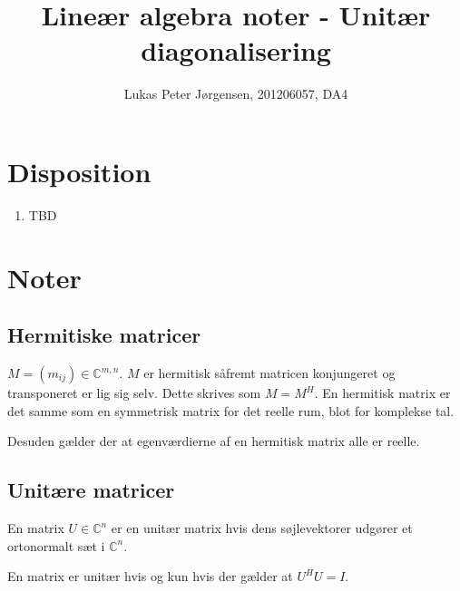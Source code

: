 \documentclass[a4paper,oneside,article]{memoir}
\begin{document}
    \title{Lineær algebra noter - Unitær diagonalisering}
    \author{Lukas Peter Jørgensen, 201206057, DA4
            }
    \maketitle
    
    \tableofcontents
        
    \chapter{Disposition}
    \begin{enumerate}
    \item TBD
    \end{enumerate}
    
	\chapter{Noter}
	
	\section{Hermitiske matricer}
	$M=(m_{ij})\in \mathbb{C}^{m,n}$. $M$ er hermitisk såfremt matricen
	konjungeret og transponeret er lig sig selv. Dette skrives som $M=M^H$.
	En hermitisk matrix er det samme som en symmetrisk matrix for det
	reelle rum, blot for komplekse tal.
	
	Desuden gælder der at egenværdierne af en hermitisk matrix alle
	er reelle.
		
	\section{Unitære matricer}
	En matrix $U\in \mathbb{C}^n$ er en unitær matrix hvis dens søjlevektorer
	udgører et ortonormalt sæt i $\mathbb{C}^n$.
	
	En matrix er unitær hvis og kun hvis der gælder at $U^HU=I$.
		
\end{document}
